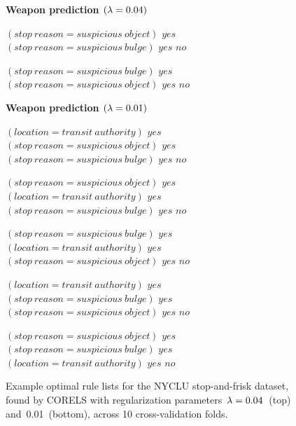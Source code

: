 \begin{figure}[b!]
\textbf{Weapon prediction $({\lambda} = 0.04)$}
\vspace{1mm}
\begin{algorithmic}
\State \bif $(stop~reason = suspicious~object)$ \bthen $yes$ 
\State \belif $(stop~reason = suspicious~bulge)$ \bthen $yes$
\State \belse $no$
\end{algorithmic}
\vspace{1mm}
\begin{algorithmic}
\State \bif $(stop~reason = suspicious~bulge)$ \bthen $yes$ 
\State \belif $(stop~reason = suspicious~object)$ \bthen $yes$
\State \belse $no$
\end{algorithmic}
\vspace{5mm}
\textbf{Weapon prediction $({\lambda} = 0.01)$}
\vspace{1mm}
\begin{algorithmic}
\State \bif $(location = transit~authority)$ \bthen $yes$ 
\State \belif $(stop~reason = suspicious~object)$ \bthen $yes$
\State \belif $(stop~reason = suspicious~bulge)$ \bthen $yes$
\State \belse $no$
\end{algorithmic}
\vspace{1mm}
\begin{algorithmic}
\State \bif $(stop~reason = suspicious~object)$ \bthen $yes$ 
\State \belif $(location = transit~authority)$ \bthen $yes$
\State \belif $(stop~reason = suspicious~bulge)$ \bthen $yes$
\State \belse $no$
\end{algorithmic}
\vspace{1mm}
\begin{algorithmic}
\State \bif $(stop~reason = suspicious~bulge)$ \bthen $yes$ 
\State \belif $(location = transit~authority)$ \bthen $yes$
\State \belif $(stop~reason = suspicious~object)$ \bthen $yes$
\State \belse $no$
\end{algorithmic}
\vspace{1mm}
\begin{algorithmic}
\State \bif $(location = transit~authority)$ \bthen $yes$ 
\State \belif $(stop~reason = suspicious~bulge)$ \bthen $yes$
\State \belif $(stop~reason = suspicious~object)$ \bthen $yes$
\State \belse $no$
\end{algorithmic}
\vspace{1mm}
\begin{algorithmic}
\State \bif $(stop~reason = suspicious~object)$ \bthen $yes$ 
\State \belif $(stop~reason = suspicious~bulge)$ \bthen $yes$
\State \belif $(location = transit~authority)$ \bthen $yes$
\State \belse $no$
\end{algorithmic}
\caption{Example optimal rule lists for the NYCLU stop-and-frisk dataset,
found by CORELS with regularization parameters~${{\lambda} = 0.04}$~(top) and~0.01~(bottom),
across 10 cross-validation folds.
}
\label{fig:weapon-rule-list-04-01}
\end{figure}

